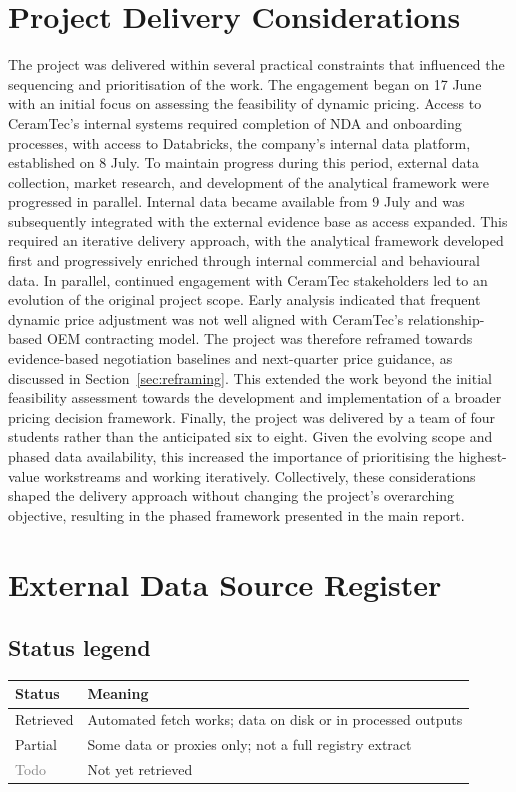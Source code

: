 \documentclass{article}
\begin{document}
\section{Project Delivery Considerations}
\label{app:project-delivery-considerations}
The project was delivered within several practical constraints that influenced the sequencing and prioritisation of the work. The engagement began on 17 June with an initial focus on assessing the feasibility of dynamic pricing. Access to CeramTec's internal systems required completion of NDA and onboarding processes, with access to Databricks, the company's internal data platform, established on 8 July. To maintain progress during this period, external data collection, market research, and development of the analytical framework were progressed in parallel. Internal data became available from 9 July and was subsequently integrated with the external evidence base as access expanded. This required an iterative delivery approach, with the analytical framework developed first and progressively enriched through internal commercial and behavioural data. In parallel, continued engagement with CeramTec stakeholders led to an evolution of the original project scope. Early analysis indicated that frequent dynamic price adjustment was not well aligned with CeramTec's relationship-based OEM contracting model. The project was therefore reframed towards evidence-based negotiation baselines and next-quarter price guidance, as discussed in Section~\ref{sec:reframing}. This extended the work beyond the initial feasibility assessment towards the development and implementation of a broader pricing decision framework. Finally, the project was delivered by a team of four students rather than the anticipated six to eight. Given the evolving scope and phased data availability, this increased the importance of prioritising the highest-value workstreams and working iteratively. Collectively, these considerations shaped the delivery approach without changing the project's overarching objective, resulting in the phased framework presented in the main report.


\section{External Data Source Register}
\label{app:external-data-register}


\subsection{Status legend}
\begin{tabular}{@{}ll@{}}
\toprule
\textbf{Status} & \textbf{Meaning} \\
\midrule
\textcolor{green!60!black}{Retrieved} & Automated fetch works; data on disk or in processed outputs \\
\textcolor{orange!85!black}{Partial} & Some data or proxies only; not a full registry extract \\
\textcolor{gray}{Todo} & Not yet retrieved \\
\bottomrule
\end{tabular}
\end{document}
